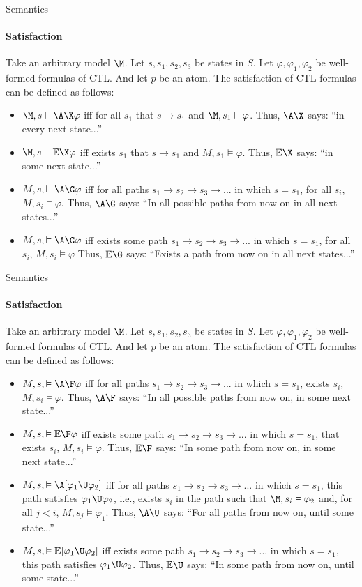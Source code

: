 \begin{frame}{Semantics}
	\framesubtitle{Satisfaction}
	Take an arbitrary model $\M$. Let $s, s_1, s_2, s_3$ be states in $S$. Let $\varphi, \varphi_1, \varphi_2$ be well-formed formulas of CTL. And let $p$ be an atom. The satisfaction of CTL formulas can be defined as follows:
	\begin{itemize}
		\item $\M,s \vDash \A\X \varphi$ iff for all $s_1$ that $s \to s_1$ and $\M,s_1 \vDash \varphi$. Thus, $\A\X$ says: ``in every next state...''\pause
		\item $\M,s \vDash \E\X \varphi$ iff exists $s_1$ that $s \to s_1$ and $M,s_1 \vDash \varphi$. Thus, $\E\X$ says: ``in some next state...''\pause
		\item $M,s, \vDash \A\G \varphi$ iff for all paths $s_1 \to s_2 \to s_3 \to ...$ in which $s = s_1$, for all $s_i$, $M, s_i \vDash \varphi$. Thus, $\A\G$ says: ``In all possible paths from now on in all next states...''\pause
		\item $M,s, \vDash \A\G \varphi$ iff exists some path $s_1 \to s_2 \to s_3 \to ...$ in which $s = s_1$, for all $s_i$, $M, s_i \vDash \varphi$ Thus, $\E\G$ says: ``Exists a path from now on in all next states...''\pause
	\end{itemize}
\end{frame}

\begin{frame}{Semantics}
	\framesubtitle{Satisfaction}
	Take an arbitrary model $\M$. Let $s, s_1, s_2, s_3$ be states in $S$. Let $\varphi, \varphi_1, \varphi_2$ be well-formed formulas of CTL. And let $p$ be an atom. The satisfaction of CTL formulas can be defined as follows:
	\begin{itemize}
		\item $M,s, \vDash \A\F \varphi$ iff for all paths $s_1 \to s_2 \to s_3 \to ...$ in which $s = s_1$, exists $s_i$, $M, s_i \vDash \varphi$. Thus, $\A\F$ says: ``In all possible paths from now on, in some next state...''\pause
		\item $M,s, \vDash \E\F \varphi$ iff exists some path $s_1 \to s_2 \to s_3 \to ...$ in which $s = s_1$, that exists $s_i$, $M, s_i \vDash \varphi$. Thus, $\E\F$ says: ``In some path from now on, in some next state...''\pause
		\item $M,s, \vDash \A[\varphi_1 \U \varphi_2]$ iff for all paths $s_1 \to s_2 \to s_3 \to ...$ in which $s = s_1$, this path satisfies $\varphi_1 \U \varphi_2$, i.e., exists $s_i$ in the path such that $\M, s_i \vDash \varphi_2$ and, for all $j < i$, $M, s_j \vDash \varphi_1$. Thus, $\A\U$ says: ``For all paths from now on, until some state...''\pause
		\item $M,s, \vDash \E[\varphi_1 \U \varphi_2]$ iff exists some path $s_1 \to s_2 \to s_3 \to ...$ in which $s = s_1$, this path satisfies $\varphi_1 \U \varphi_2$. Thus, $\E\U$ says: ``In some path from now on, until some state...''
	\end{itemize}
\end{frame}